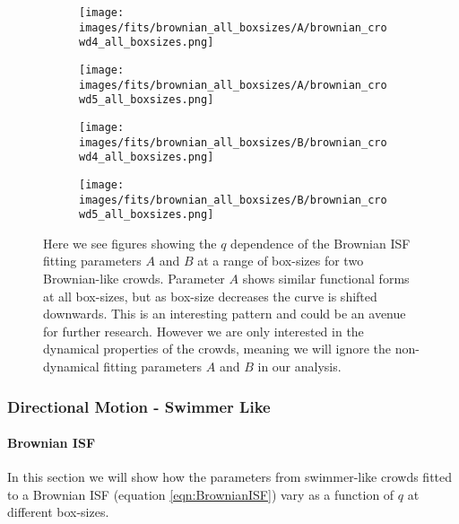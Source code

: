 \documentclass[10pt]{article}
\begin{document}
\begin{figure}[H]
\begin{subfigure}[t]{.5\textwidth}
  \centering
 \texttt{[image: images/fits/brownian\_all\_boxsizes/A/brownian\_crowd4\_all\_boxsizes.png]}
  \caption{}
\end{subfigure}%
\hfill
\begin{subfigure}[t]{.5\textwidth}
  \centering
  \texttt{[image: images/fits/brownian\_all\_boxsizes/A/brownian\_crowd5\_all\_boxsizes.png]}
  \caption{}
\end{subfigure}
\label{fig:crowd_brownian_fits_A_all_boxsizes}
\par\bigskip
\begin{subfigure}[t]{.5\textwidth}
  \centering
 \texttt{[image: images/fits/brownian\_all\_boxsizes/B/brownian\_crowd4\_all\_boxsizes.png]}
  \caption{}
\end{subfigure}%
\hfill
\begin{subfigure}[t]{.5\textwidth}
  \centering
  \texttt{[image: images/fits/brownian\_all\_boxsizes/B/brownian\_crowd5\_all\_boxsizes.png]}
  \caption{}
\end{subfigure}
\caption{Here we see figures showing the $q$ dependence of the Brownian ISF fitting parameters $A$ and $B$ at a range of box-sizes for two Brownian-like crowds. Parameter $A$ shows similar functional forms at all box-sizes, but as box-size decreases the curve is shifted downwards. This is an interesting pattern and could be an avenue for further research. However we are only interested in the dynamical properties of the crowds, meaning we will ignore the non-dynamical fitting parameters $A$ and $B$ in our analysis.}
\label{fig:crowd_brownian_fits_tauc_B_boxsizes}
\end{figure}
\clearpage
\subsubsection{Directional Motion - Swimmer Like}
\paragraph{Brownian ISF} In this section we will show how the parameters from swimmer-like crowds fitted to a Brownian ISF (equation \ref{eqn:BrownianISF}) vary as a function of $q$ at different box-sizes.
\end{document}
